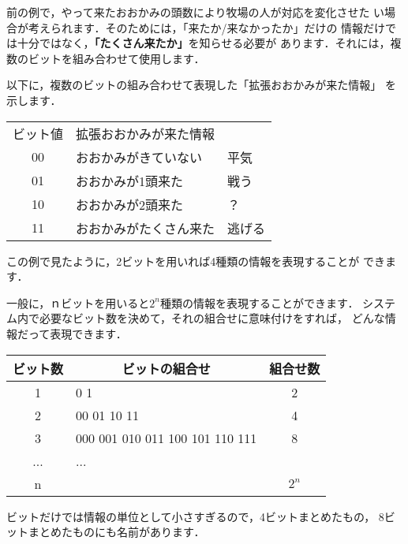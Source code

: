 前の例で，やって来たおおかみの頭数により牧場の人が対応を変化させた
い場合が考えられます．そのためには，「来たか/来なかったか」だけの
情報だけでは十分ではなく，{\bf 「たくさん来たか」}を知らせる必要が
あります．それには，複数のビットを組み合わせて使用します．

以下に，複数のビットの組み合わせて表現した「拡張おおかみが来た情報」
を示します．

\begin{center}
\begin{tabular}{|c|l|l} \cline{1-2}
ビット値 & 拡張おおかみが来た情報 & \\
\cline{1-2}
00 & おおかみがきていない   & 平気 \\
01 & おおかみが1頭来た     & 戦う\\
10 & おおかみが2頭来た     & ？\\
11 & おおかみがたくさん来た & 逃げる \\
\cline{1-2}
\end{tabular}
\end{center}

\begin{center}
\end{center}

この例で見たように，2ビットを用いれば4種類の情報を表現することが
できます．

一般に，ｎビットを用いると$2^n$種類の情報を表現することができます．
システム内で必要なビット数を決めて，それの組合せに意味付けをすれば，
どんな情報だって表現できます．

{\footnotesize
\begin{center}
\begin{tabular}{|c|l|c|} \hline
ビット数 & \multicolumn{1}{c|}{ビットの組合せ} & 組合せ数\\
\hline
1 & 0 1   & 2 \\
2 & 00 01 10 11 & 4 \\
3 & 000 001 010 011 100 101 110 111 & 8 \\
...& ... &\\
n &  & $2^n$ \\
\hline
\end{tabular}
\end{center}
}

ビットだけでは情報の単位として小さすぎるので，4ビットまとめたもの，
8ビットまとめたものにも名前があります．

